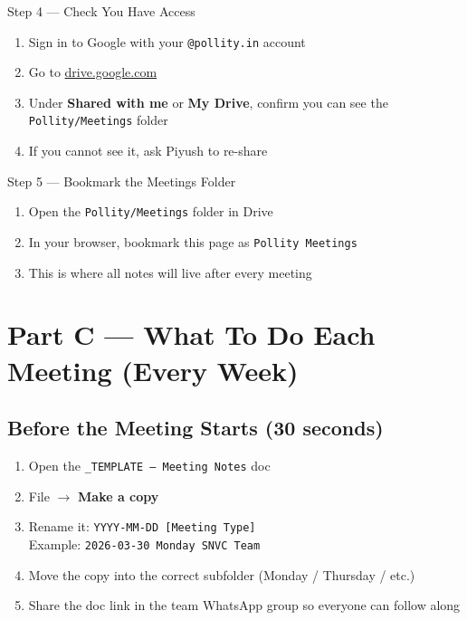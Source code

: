 \documentclass[11pt, a4paper]{article}
\begin{document}
\begin{stepbox}{Step 4 — Check You Have Access}
\begin{enumerate}[leftmargin=1.5em]
  \item Sign in to Google with your \texttt{@pollity.in} account
  \item Go to \href{https://drive.google.com}{drive.google.com}
  \item Under \textbf{Shared with me} or \textbf{My Drive}, confirm you can see the \texttt{Pollity/Meetings} folder
  \item If you cannot see it, ask Piyush to re-share
\end{enumerate}
\end{stepbox}

\vspace{1em}

\begin{stepbox}{Step 5 — Bookmark the Meetings Folder}
\begin{enumerate}[leftmargin=1.5em]
  \item Open the \texttt{Pollity/Meetings} folder in Drive
  \item In your browser, bookmark this page as \texttt{Pollity Meetings}
  \item This is where all notes will live after every meeting
\end{enumerate}
\end{stepbox}

\newpage

\section{Part C — What To Do Each Meeting (Every Week)}

\subsection{Before the Meeting Starts (30 seconds)}

\begin{enumerate}[leftmargin=1.5em]
  \item Open the \texttt{\_TEMPLATE -- Meeting Notes} doc
  \item File $\to$ \textbf{Make a copy}
  \item Rename it: \texttt{YYYY-MM-DD [Meeting Type]} \\
  Example: \texttt{2026-03-30 Monday SNVC Team}
  \item Move the copy into the correct subfolder (Monday / Thursday / etc.)
  \item Share the doc link in the team WhatsApp group so everyone can follow along
\end{enumerate}
\end{document}
